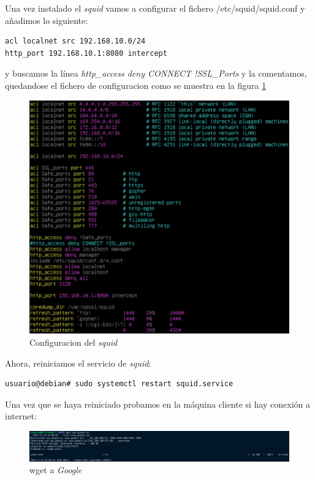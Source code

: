 \documentclass{report}
\begin{document}
  Una vez instalado el \emph{squid} vamos a configurar el fichero /etc/squid/squid.conf y añadimos lo siguiente:

  \begin{verbatim}
acl localnet src 192.168.10.0/24
http_port 192.168.10.1:8080 intercept
  \end{verbatim}

  y buscamos la línea \emph{http\_access deny CONNECT !SSL\_Ports} y la comentamos, quedandose el fichero de configuracion como se muestra en la figura \ref{fig:squid config}
  
  \begin{figure}[H]
    \centering
    \includegraphics[scale=0.65]{img/config_squid.png}
    \caption{Configuracion del \emph{squid}}
    \label{fig:squid config}
  \end{figure}

  Ahora, reiniciamos el servicio de \emph{squid}:
  \begin{verbatim}
usuario@debian# sudo systemctl restart squid.service
  \end{verbatim}

  Una vez que se haya reiniciado probamos en la máquina cliente si hay conexión a internet:

  \begin{figure}[H]
    \centering
    \includegraphics[scale=0.37]{img/wget_google.png}
    \caption{wget a \emph{Google}}
    \label{fig:wget google}
  \end{figure} 
\end{document}
